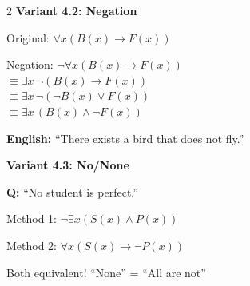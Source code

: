 \documentclass[8pt,a4paper]{article}
\newenvironment{exbox}[1][]{\vspace{2pt}\noindent\textbf{#1}\par\smallskip}{\vspace{2pt}}
\begin{document}
\begin{multicols}{2}
\begin{exbox}[Variant 4.2: Negation]
Original: $\forall x(B(x) \to F(x))$

Negation: $\neg \forall x(B(x) \to F(x))$\\
$\equiv \exists x\, \neg(B(x) \to F(x))$\\
$\equiv \exists x\, \neg(\neg B(x) \lor F(x))$\\
$\equiv \exists x\, (B(x) \land \neg F(x))$

\textbf{English:} ``There exists a bird that does not fly.''
\end{exbox}

\begin{exbox}[Variant 4.3: No/None]
\textbf{Q:} ``No student is perfect.''

Method 1: $\neg \exists x(S(x) \land P(x))$

Method 2: $\forall x(S(x) \to \neg P(x))$

Both equivalent! ``None'' = ``All are not''
\end{exbox}

\end{multicols}

\newpage
\end{document}
